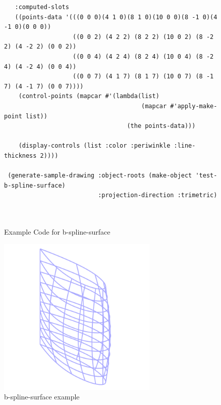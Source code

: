 \documentclass [11pt]{book}
\begin{document}
\begin{itemize}
\begin{figure}
\begin{lrbox}{\boxedverb}
\begin{minipage}{\linewidth}
{\begin{verbatim}
   :computed-slots
   ((points-data '(((0 0 0)(4 1 0)(8 1 0)(10 0 0)(8 -1 0)(4 -1 0)(0 0 0))
                   ((0 0 2) (4 2 2) (8 2 2) (10 0 2) (8 -2 2) (4 -2 2) (0 0 2))
                   ((0 0 4) (4 2 4) (8 2 4) (10 0 4) (8 -2 4) (4 -2 4) (0 0 4))
                   ((0 0 7) (4 1 7) (8 1 7) (10 0 7) (8 -1 7) (4 -1 7) (0 0 7))))
    (control-points (mapcar #'(lambda(list) 
                                      (mapcar #'apply-make-point list)) 
                                  (the points-data)))

    (display-controls (list :color :periwinkle :line-thickness 2))))
  
 (generate-sample-drawing :object-roots (make-object 'test-b-spline-surface)
                          :projection-direction :trimetric)

 
\end{verbatim}}
\end{minipage}
\end{lrbox}
\fbox{\usebox{\boxedverb}}

\caption{Example Code for b-spline-surface}

\label{fig:example-code-b-spline-surface}

\end{figure}

\begin{figure}
\begin{center}
\includegraphics[width=3in,height=3in]{../images/example-b-spline-surface.pdf}
\end{center}

\caption{b-spline-surface example}

\label{fig:b-spline-surface}

\end{figure}






\end{itemize}
\end{document}
